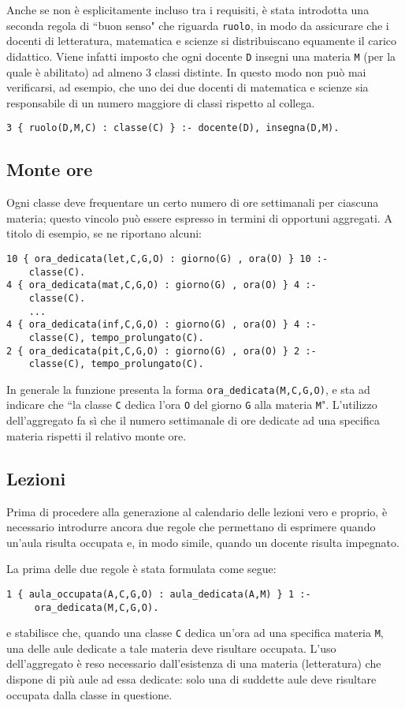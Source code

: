 Anche se non è esplicitamente incluso tra i requisiti, è stata introdotta una seconda regola di ``buon senso" che riguarda \texttt{ruolo}, in modo da assicurare che i docenti di letteratura, matematica e scienze si distribuiscano equamente il carico didattico. Viene infatti imposto che ogni docente \texttt{D} insegni una materia \texttt{M} (per la quale è abilitato) ad almeno 3 classi distinte. In questo modo non può mai verificarsi, ad esempio, che uno dei due docenti di matematica e scienze sia responsabile di un numero maggiore di classi rispetto al collega.
\begin{lstlisting}[frame=single]
3 { ruolo(D,M,C) : classe(C) } :- docente(D), insegna(D,M).
\end{lstlisting}

\subsection{Monte ore}
Ogni classe deve frequentare un certo numero di ore settimanali per ciascuna materia; questo vincolo può essere espresso in termini di opportuni aggregati. A titolo di esempio, se ne riportano alcuni: 
\begin{lstlisting}[frame=single]
10 { ora_dedicata(let,C,G,O) : giorno(G) , ora(O) } 10 :-
	classe(C).
4 { ora_dedicata(mat,C,G,O) : giorno(G) , ora(O) } 4 :- 
	classe(C).
    ...
4 { ora_dedicata(inf,C,G,O) : giorno(G) , ora(O) } 4 :- 
	classe(C), tempo_prolungato(C).
2 { ora_dedicata(pit,C,G,O) : giorno(G) , ora(O) } 2 :- 
	classe(C), tempo_prolungato(C).
\end{lstlisting}
In generale la funzione presenta la forma \texttt{ora\_dedicata(M,C,G,O)}, e sta ad indicare che ``la classe \texttt{C} dedica l'ora \texttt{O} del giorno \texttt{G} alla materia \texttt{M}". L'utilizzo dell'aggregato fa sì che il numero settimanale di ore dedicate ad una specifica materia rispetti il relativo monte ore.

\subsection{Lezioni}
Prima di procedere alla generazione al calendario delle lezioni vero e proprio, è necessario introdurre ancora due regole che permettano di esprimere quando un'aula risulta occupata e, in modo simile, quando un docente risulta impegnato.

La prima delle due regole è stata formulata come segue:
\begin{lstlisting}[frame=single]
1 { aula_occupata(A,C,G,O) : aula_dedicata(A,M) } 1 :-
	 ora_dedicata(M,C,G,O).
\end{lstlisting}
e stabilisce che, quando una classe \texttt{C} dedica un'ora ad una specifica materia \texttt{M}, una delle aule dedicate a tale materia deve risultare occupata. L'uso dell'aggregato è reso necessario dall'esistenza di una materia (letteratura) che dispone di più aule ad essa dedicate: solo una di suddette aule deve risultare occupata dalla classe in questione.

